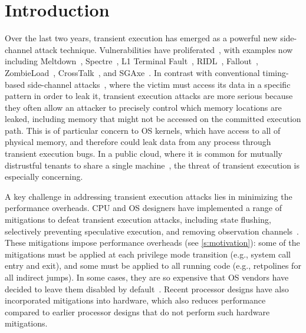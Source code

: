 \section*{Introduction}

Over the last two years, transient execution has emerged as a
powerful new side-channel attack technique.  Vulnerabilities have
proliferated~\cite{sok:transient,hill:survey}, with examples now including Meltdown~\cite{lipp:meltdown},
Spectre~\cite{kocher:spectre}, L1 Terminal Fault~\cite{bulck:foreshadow}, RIDL~\cite{schaik:ridl},
Fallout~\cite{canella:fallout}, ZombieLoad~\cite{schwarz:zombieload},
CrossTalk~\cite{ragab:crosstalk}, and SGAxe~\cite{sgaxe}.  In contrast
with conventional timing-based side-channel attacks~\cite{kocher:timing},
where the victim must access its data in a specific pattern in order
to leak it, transient execution attacks are more serious because they
often allow an attacker to precisely control which memory locations are
leaked, including memory that might not be accessed on the committed
execution path.  This is of particular concern to OS kernels, which have
access to all of physical memory, and therefore could leak data from any
process through transient execution bugs.  In a public cloud,
where it is common for mutually distrustful tenants to share
a single machine~\cite{borg, cpi2}, the threat of transient execution
is especially concerning.

A key challenge in addressing transient execution attacks lies in
minimizing the performance overheads.  CPU and OS designers have
implemented a range of mitigations to defeat transient execution
attacks, including state flushing, selectively preventing speculative
execution, and removing observation channels~\cite{sok:transient}.
These mitigations impose performance overheads (see
\autoref{s:motivation}): some of the mitigations must be applied at
each privilege mode transition (e.g., system call entry and exit), and
some must be applied to all running code (e.g., retpolines for all
indirect jumps).  In some cases, they are so expensive that OS vendors
have decided to leave them disabled by default~\cite{apple_support,
  microsoft_support}.  Recent processor designs have also incorporated
mitigations into hardware, which also reduces performance compared to
earlier processor designs that do not perform such hardware
mitigations.


